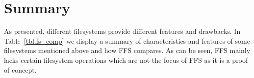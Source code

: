 
\section{Summary} %


As presented, different filesystems provide different features and drawbacks. 
In Table~\ref{tbl:fs_comp} we display a summary of characteristics and features 
of some filesystems mentioned above and how \gls{FFS} compares. As can be seen, \gls{FFS} 
mainly lacks certain filesystem operations which are not the focus of
\gls{FFS} as it is a proof of concept. 

